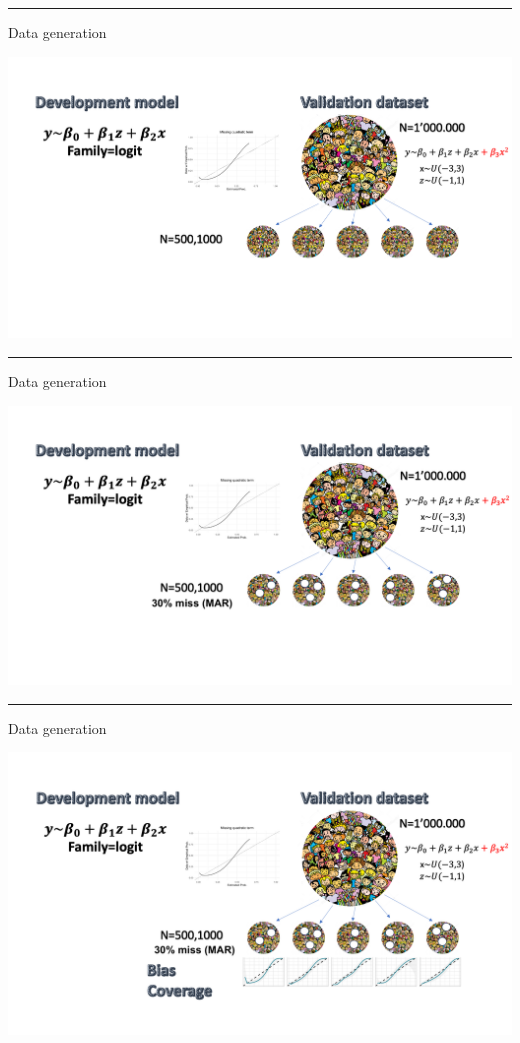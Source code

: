\documentclass[
  letterpaper,
  DIV=11,
  numbers=noendperiod]{scrartcl}
\begin{document}
\begin{center}\rule{0.5\linewidth}{0.5pt}\end{center}

{ Data generation}

\includegraphics{images/d3.png}

\begin{center}\rule{0.5\linewidth}{0.5pt}\end{center}

{ Data generation}

\includegraphics{images/d4.png}

\begin{center}\rule{0.5\linewidth}{0.5pt}\end{center}

{ Data generation}

\includegraphics{images/d5.png}
\end{document}
